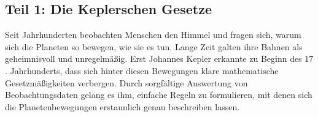 \documentclass{scrartcl}
\begin{document}
        \subsection*{Teil 1: Die Keplerschen Gesetze}
        Seit Jahrhunderten beobachten Menschen den Himmel und fragen sich, warum sich die Planeten so bewegen, wie sie es tun. Lange Zeit galten ihre Bahnen als geheimnisvoll und unregelmäßig. Erst Johannes Kepler erkannte zu Beginn des $17$. Jahrhunderts, dass sich hinter diesen Bewegungen klare mathematische Gesetzmäßigkeiten verbergen. Durch sorgfältige Auswertung von Beobachtungsdaten gelang es ihm, einfache Regeln zu formulieren, mit denen sich die Planetenbewegungen erstaunlich genau beschreiben lassen.
\end{document}
